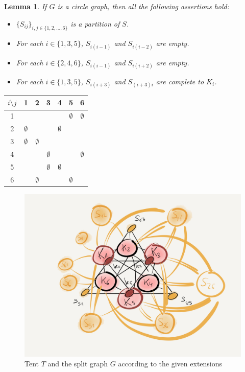 \documentclass[a4paper,10pt]{report}
\theoremstyle{plain}
\newtheorem{lema}{Lemma}
\theoremstyle{remark}
\theoremstyle{plain}
\begin{document}
{\begin{lema} If $G$ is a circle graph, then all the following assertions hold:
 \begin{itemize}
  \item $\{S_{ij}\}_{i,j\in\{1,2,\ldots,6\}}$ is a partition of $S$.
  \item For each $i\in\{1,3,5\}$, $S_{i(i-1)}$ and $S_{i(i-2)}$ are empty.
  \item For each $i\in\{2,4,6\}$, $S_{i(i-1)}$ and $S_{i(i+2)}$ are empty.
  \item For each $i\in\{1,3,5\}$, $S_{i(i+3)}$ and $S_{(i+3)i}$ are complete to $K_i$.
 \end{itemize}
\end{lema}

\begin{center}
	\begin{tabular}{ c | c c c c c c } 
		 \hline
		 $i\setminus j$ & 1 & 2 & 3 & 4 & 5 & 6 \\ 
		  \hline
		 1 & \checkmark & \checkmark & \checkmark & \checkmark & $\emptyset$ & $\emptyset$ \\ 
		 2 & $\emptyset$ & \checkmark & \checkmark & $\emptyset$ & \checkmark & \checkmark \\
 		 3 & $\emptyset$ & $\emptyset$ & \checkmark & \checkmark & \checkmark & \checkmark \\
		 4 & \checkmark & \checkmark & $\emptyset$ & \checkmark & \checkmark & $\emptyset$ \\
		 5 & \checkmark & \checkmark & $\emptyset$ & $\emptyset$ & \checkmark & \checkmark \\
		 6 & \checkmark & $\emptyset$ & \checkmark & \checkmark & $\emptyset$ & \checkmark \\
	\end{tabular}
\end{center}

\begin{figure}[h!]
	\begin{center}
		\includegraphics[scale=.15]{tent_ext.png}
	\end{center}
	\caption{Tent $T$ and the split graph $G$ according to the given extensions}
\end{figure}

}
\end{document}

